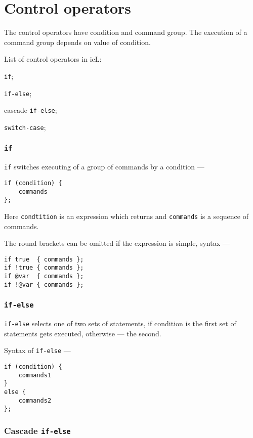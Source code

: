 \section{Control operators}

The control operators have condition and command group. The execution of a command group depends on value of condition.
 
 List of control operators in icL:
\begin{icItems}
	\item \texttt{if};
	\item \texttt{if-else};
	\item cascade \texttt{if-else};
	\item \texttt{switch-case};
\end{icItems}

\subsubsection{\texttt{if}}

\texttt{if} switches executing of a group of commands by a condition —
\begin{verbatim}
if (condition) {
	commands
};
\end{verbatim}
Here \texttt{condtition} is an expression which returns \bool{} and \texttt{commands} is a sequence of commands.

The round brackets can be omitted if the expression is simple, syntax —
\begin{verbatim}
if true  { commands };
if !true { commands };
if @var  { commands };
if !@var { commands };
\end{verbatim}

\subsubsection{\texttt{if-else}}

\texttt{if-else} selects one of two sets of statements, if condition is \true{} the first set of statements gets executed, otherwise — the second.

Syntax of \texttt{if-else} —
\begin{verbatim}
if (condition) {
	commands1
}
else {
	commands2
};
\end{verbatim}

\subsubsection{Cascade \texttt{if-else}}

